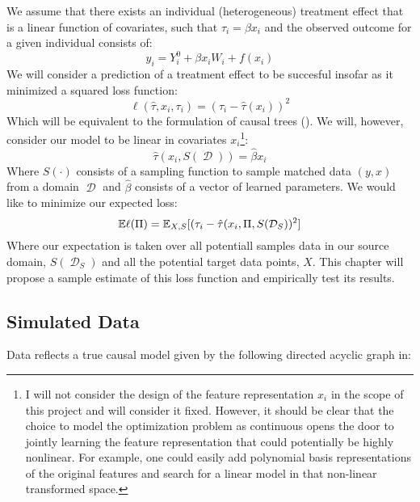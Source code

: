 \documentclass[a4paper,12pt]{article}
\DeclareMathOperator*{\D}{\mathcal{D}}
\begin{document}
We assume that there exists an individual (heterogeneous) treatment effect that is a linear function of covariates, such that $\tau_i = \beta x_i$ and the observed outcome for a given individual consists of:
%
$$
y_i = Y^0_i + \beta x_iW_i + f(x_i)
$$
%
We will consider a prediction of a treatment effect to be succesful insofar as it minimized a squared loss function:
%
$$
\ell(\hat{\tau}, x_i, \tau_i) = (\tau_i - \hat{\tau}(x_i))^2
$$
%
Which will be equivalent to the formulation of causal trees (\cite{Athey2016}). We will, however, consider our model to be linear in covariates $x_i$\footnote{I will not consider the design of the feature representation $x_i$ in the scope of this project and will consider it fixed. However, it should be clear that the choice to model the optimization problem as continuous opens the door to jointly learning the feature representation that could potentially be highly nonlinear. For example, one could easily add polynomial basis representations of the original features and search for a linear model in that non-linear transformed space.}:
%
$$
\hat{\tau}(x_i, S(\D)) = \hat{\beta} x_i
$$
%
Where $S(\cdot)$ consists of a sampling function to sample matched data $(y, x)$ from a domain $\D$ and $\hat{\beta}$ consists of a vector of learned parameters. We would like to minimize our expected loss:
%
$$
\mathbb{E} \ell(\Pi) = \mathbb{E}_{X, S} [ (\tau_i - \hat{\tau}(x_i, \Pi, S(\mathcal{D}_S))^2  ]
$$
%
Where our expectation is taken over all potentiall samples data in our source domain, $S(\D_S)$ and all the potential target data points, $X$. This chapter will propose a sample estimate of this loss function and empirically test its results. 

\subsection{ Simulated Data }

Data reflects a true causal model given by the following directed acyclic graph in:

\vspace{5mm}
\vspace{5mm}
\end{document}

